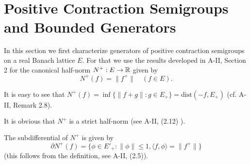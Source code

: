 \section{Positive Contraction Semigroups and Bounded  
\phantom{Gen-} Generators}\label{sec:c2-1}
In this section we first characterize generators of positive contraction semigroups on a real Banach lattice $E$.
For that we use the results developed in A-II, Section 2 for the canonical half-norm $N^{+} : E \to \mathbb{R}$ given by
\begin{equation}\label{eq:c2-1.1}
N^{+}(f) = \|f^{+}\| \quad (f \in E).
\end{equation}

\begin{remark*}\label{rem:c2-1.1}
It is easy to see that $N^{+}(f) = \inf \{\|f+g\| : g \in E_{+}\} = \text{dist}(-f,E_{+})$ (cf. A-II, Remark 2.8). 
\end{remark*}

It is obvious that $N^{+}$ is a strict half-norm (see A-II, (2.12) ). 

The subdifferential of $N^{+}$ is given by
\begin{equation}\label{eq:c2-1.2}
\partial N^{+}(f) = \{\phi \in E'_{+} : \|\phi\| \leq 1, \langle f,\phi \rangle = \|f^{+}\|\}
\end{equation}
(this follows from the definition, see A-II, (2.5)). 

